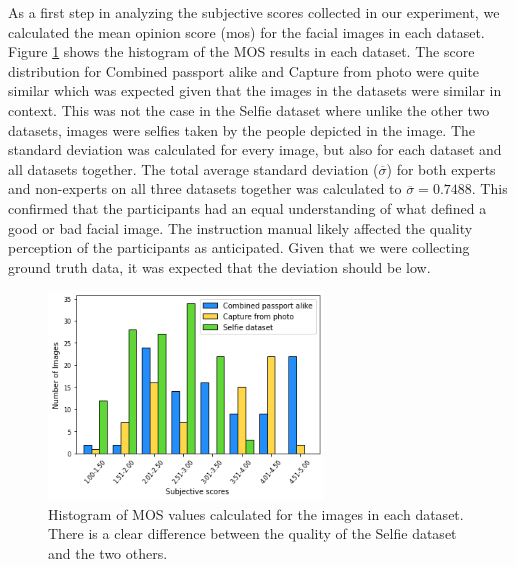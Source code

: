 As a first step in analyzing the subjective scores collected in our experiment, we calculated the mean opinion score (\acrshort{mos}) for the facial images in each dataset. Figure \ref{fig:MobaiHistogram} shows the histogram of the MOS results in each dataset. The score distribution for Combined passport alike and Capture from photo were quite similar which was expected given that the images in the datasets were similar in context. This was not the case in the Selfie dataset where unlike the other two datasets, images were selfies taken by the people depicted in the image. The standard deviation was calculated for every image, but also for each dataset and all datasets together. The total average standard deviation ($\overline{\sigma}$) for both experts and non-experts on all three datasets together was calculated to $\overline{\sigma} = 0.7488$. This confirmed that the participants had an equal understanding of what defined a good or bad facial image. The instruction manual likely affected the quality perception of the participants as anticipated. Given that we were collecting ground truth data, it was expected that the deviation should be low.   

\begin{figure}[h]
    \centering
    \includegraphics[width=0.65\textwidth]{figures/MobaiDS_Histogram.png}
    \caption{Histogram of MOS values calculated  for the images in each dataset. There is a clear difference between the quality of the Selfie dataset and the two others.}
    \label{fig:MobaiHistogram}
\end{figure}

